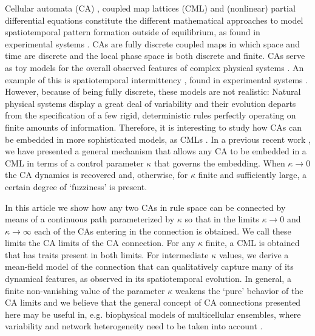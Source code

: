 \documentclass[aps,pre,preprint,floatfix]{revtex4}
\theoremstyle{plain} \newtheorem{defi}{Definition}[section]
\theoremstyle{plain} \newtheorem{prop}{Proposition}[section]
\theoremstyle{plain} \newtheorem{theor}{Theorem}[section]
\theoremstyle{plain} \newtheorem{lemma}{Lemma}[section]
\theoremstyle{plain} \newtheorem*{corol}{Corollary}
\theoremstyle{remark} \newtheorem*{rem}{Remark}
\theoremstyle{plain} \newtheorem{exer}{Exercise}[section]
\theoremstyle{remark} \newtheorem*{ans}{Answer}
\begin{document}
Cellular automata (CA) \cite{Wolfram, DeutschBOOK, Tokihiro1, Ilachinski, Adamatzky, Wuensche, VGM1, semipredo,VGM2,VGM3}, coupled map lattices (CML) \cite{Kaneko1, Kaneko2, Kapral, KanekoBOOK, Bunimovich2, Bunimovich3,JPHYSA} and (nonlinear) partial differential equations \cite{Hohenberg, KuramotoBOOK} constitute the different mathematical approaches to model spatiotemporal pattern formation outside of equilibrium, as found in experimental systems \cite{DeutschBOOK}. CAs are fully discrete coupled maps in which space and time are discrete and the local phase space is both discrete and finite. CAs serve as toy models for the overall observed features of complex physical systems \cite{Wolfram}. An example of this is spatiotemporal intermittency \cite{Wolfram, Jabeen1, Jabeen2}, found in experimental systems \cite{Ciliberto, Daviaud, Bottin, Degen, Colovas, Goharzadeh,  Michalland}. However, because of being fully discrete, these models are not realistic: Natural physical systems display a great deal of variability and their evolution departs from the specification of a few rigid, deterministic rules perfectly operating on finite amounts of information. Therefore, it is interesting to study how CAs can be embedded in more sophisticated models, as CMLs \cite{Chate1, Chate2, Chate3,Tokihiro1, Tokihiro3, Tokihiro4, Tokihiro5, Bialecki1, Bialecki2, Bagnoli,Just,JPHYSA}. In a previous recent work \cite{JPHYSA}, we have presented a general mechanism that allows any CA to be embedded in a CML in terms of a control parameter $\kappa$ that governs the embedding. When $\kappa \to 0$ the CA dynamics is recovered and, otherwise, for $\kappa$ finite and sufficiently large, a certain degree of `fuzziness' is present. 

In this article we show how any two CAs in rule space can be connected by means of a continuous path parameterized by $\kappa$ so that in the limits $\kappa \to 0$ and $\kappa \to \infty$ each of the CAs entering in the connection is obtained. We call these limits the CA limits of the CA connection. For any $\kappa$ finite, a CML is obtained that has traits present in both limits. For intermediate $\kappa$ values, we derive a  mean-field model of the connection that can qualitatively capture many of its dynamical features, as observed in its spatiotemporal evolution. In general, a finite non-vanishing value of the parameter $\kappa$ weakens the `pure' behavior of the CA limits and we believe that the general concept of CA connections presented here may be useful in, e.g. biophysical models of multicellular ensembles, where variability and network heterogeneity need to be taken into account  \cite{VGMSMJA}.  
\end{document}
